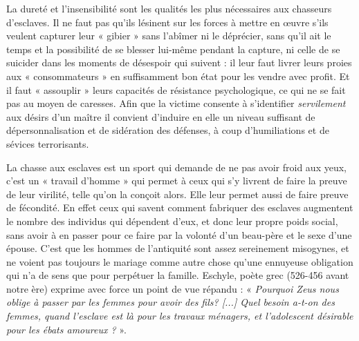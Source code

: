  La dureté et l'insensibilité sont les qualités les plus nécessaires aux chasseurs d'esclaves. Il ne faut pas qu'ils lésinent sur les forces à mettre en œuvre s'ils veulent capturer leur « gibier » sans l'abîmer ni le déprécier, sans qu'il ait le temps et la possibilité de se blesser lui-même pendant la capture, ni celle de se suicider dans les moments de désespoir qui suivent : il leur faut livrer leurs proies aux « consommateurs » en suffisamment bon état pour les vendre avec profit. Et il faut « assouplir » leurs capacités de résistance psychologique, ce qui ne se fait pas au moyen de caresses. Afin que la victime consente à s'identifier \emph{servilement} aux désirs d'un maître il convient d'induire en elle un niveau suffisant de dépersonnalisation et de sidération des défenses, à coup d'humiliations et de sévices terrorisants. 

 La chasse aux esclaves est un sport qui demande de ne pas avoir froid aux yeux, c'est un « travail d'homme » qui permet à ceux qui s'y livrent de faire la preuve de leur virilité, telle qu'on la conçoit alors. Elle leur permet aussi de faire preuve de fécondité. En effet ceux qui savent comment fabriquer des esclaves augmentent le nombre des individus qui dépendent d'eux, et donc leur propre poids social, sans avoir à en passer pour ce faire par la volonté d'un beau-père et le sexe d'une épouse. C'est que les hommes de l'antiquité sont assez sereinement misogynes, et ne voient pas toujours le mariage comme autre chose qu'une ennuyeuse obligation qui n'a de sens que pour perpétuer la famille. Eschyle, poète grec (526-456 avant notre ère) exprime avec force un point de vue répandu : « \emph{Pourquoi Zeus nous oblige à passer par les femmes pour avoir des fils? \emph{[...]} Quel besoin a-t-on des femmes, quand l'esclave est là pour les travaux ménagers, et l'adolescent désirable pour les ébats amoureux ?} ». 

